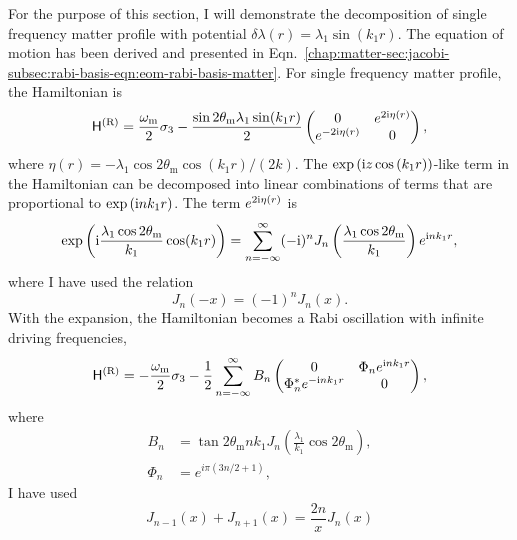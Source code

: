 For the purpose of this section, I will demonstrate the decomposition of single frequency matter profile with potential $\delta\lambda(r) = \lambda_1\sin(k_1 r)$. The equation of motion has been derived and presented in Eqn.~\ref{chap:matter-sec:jacobi-subsec:rabi-basis-eqn:eom-rabi-basis-matter}. For single frequency matter profile, the Hamiltonian is 
\begin{equation}
    \mathsf H^{(\mathrm R)}= \frac{\omega_\mathrm m}{2} \sigma_3 - \frac{\sin 2\theta_\mathrm m \lambda_1\sin (k_1 r)}{2} \begin{pmatrix}
        0 & e^{2\mathrm{i} \eta(r)} \\
        e^{-2\mathrm{i} \eta(r)} & 0
    \end{pmatrix},
\end{equation}
where $\eta(r) = - \lambda_1 \cos 2\theta_{\mathrm m} \cos (k_1 r)/(2 k) $. The $\exp\left( \mathrm{i} z \cos\left(k_1 r \right) \right)$-like term in the Hamiltonian can be decomposed into linear combinations of terms that are proportional to $\exp\left(\mathrm{i} n k_1 r \right)$. The term $e^{2\mathrm{i} \eta(r)}$ is
\begin{equation}
    \exp\left({\mathrm{i} \frac{\lambda_1 \cos 2\theta_{\mathrm m}}{k_1} \cos (k_1 r) }\right)  =  \sum_{n=-\infty}^{\infty} (-\mathrm{i})^n J_n \left( \frac{\lambda_1\cos 2\theta_\mathrm m}{k_1}\right) e^{\mathrm{i} n k_1 r} ,
\end{equation}
where I have used the relation
\begin{equation}
    J_n(- x) = (-1)^n J_n(x).
\end{equation}
With the expansion, the Hamiltonian becomes a Rabi oscillation with infinite driving frequencies,
\begin{equation}
    \mathsf H^{(\mathrm{R})} =
    -\frac{\omega_{\mathrm{m}}}{2} \sigma_3
    -  \frac{1}{2} \sum_{n=-\infty}^\infty B_n \begin{pmatrix}
    0 &  \Phi_n e^{\ri n k_1  r} \\
     \Phi_n^* e^{ - \ri n k_1 r} & 0
    \end{pmatrix},
    \label{chap:matter-sec:jacobi-eqn:hamil-jacobi-expanded}
\end{equation}
where
\begin{align}
    B_n &= \tan 2\theta_{\mathrm m} n k_1 J_{n} \left( \frac{\lambda_1}{k_1}\cos 2\theta_{\mathrm m} \right),\\
    \Phi_n &= e^{i\pi (3n/2+1)},
\end{align}
I have used
\begin{equation}
    J_{n-1}(x) + J_{n+1}(x) = \frac{2 n}{x} J_n(x)
    \label{eqn:bessel-function-sum-property}
\end{equation}
